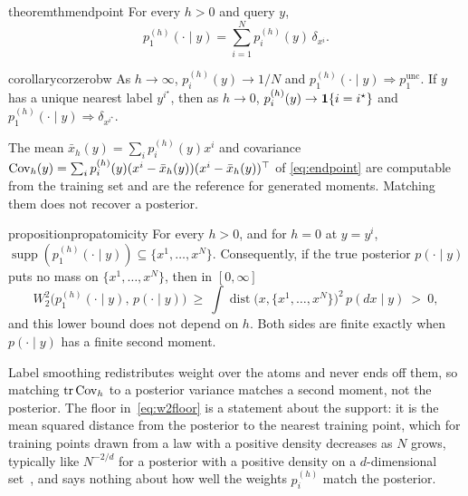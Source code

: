 \documentclass{article} %
\newif\ificlr
\theoremstyle{plain}
\theoremstyle{definition}
\theoremstyle{remark}
\begin{document}
\begin{restatable}{theorem}{thmendpoint}
\label{thm:endpoint}
For every $h>0$ and query $y$,
\begin{equation}
p_1^{(h)}(\cdot\mid y)=\sum_{i=1}^N p_i^{(h)}(y)\,\delta_{x^i}.
\label{eq:endpoint}
\end{equation} 
\end{restatable}

\begin{restatable}{corollary}{corzerobw}
\label{cor:zerobw}
As $h\to\infty$, $p_i^{(h)}(y)\to1/N$ and $p_1^{(h)}(\cdot\mid y)\Rightarrow p_1^{\mathrm{unc}}$. If
$y$ has a unique nearest label $y^{i^\star}$, then as $h\to0$, $p_i^{(h)}(y)\to\mathbf{1}\{i=i^\star\}$
and $p_1^{(h)}(\cdot\mid y)\Rightarrow\delta_{x^{i^\star}}$. 
\end{restatable}
The mean $\bar x_h(y)=\sum_ip_i^{(h)}(y)x^i$ and covariance
$\operatorname{Cov}_h(y)=\sum_ip_i^{(h)}(y)(x^i-\bar x_h(y))(x^i-\bar x_h(y))^\top$ of \eqref{eq:endpoint} are
computable from the training set and are the reference for generated moments. Matching them
does not recover a posterior.

\begin{restatable}{proposition}{propatomicity}
\label{prop:atomicity}
For every $h>0$, and for $h=0$ at $y=y^i$, $\operatorname{supp}(p_1^{(h)}(\cdot\mid y))
\subseteq\{x^1,\dots,x^N\}$. Consequently, if the true posterior $p(\cdot\mid y)$ puts no
mass on $\{x^1,\dots,x^N\}$, then in $[0,\infty]$
\begin{equation}
W_2^2\big(p_1^{(h)}(\cdot\mid y),\,p(\cdot\mid y)\big)\ \ge\
\int\operatorname{dist}\big(x,\{x^1,\dots,x^N\}\big)^2\,p(dx\mid y)\ >\ 0,
\label{eq:w2floor}
\end{equation}
and this lower bound does not depend on $h$. Both sides are finite exactly when
$p(\cdot\mid y)$ has a finite second moment. \proofin{apx:pf-atomicity}
\end{restatable}
Label smoothing redistributes weight over the atoms and never ends off them, so
matching $\operatorname{tr}\operatorname{Cov}_h$ to a posterior variance matches a second moment, not the posterior.\ificlr\else{}
The floor in~\eqref{eq:w2floor} is a statement about the support: it is the mean squared distance
from the posterior to the nearest training point, which for training points drawn from a law with a
positive density decreases as $N$ grows, typically like $N^{-2/d}$ for a posterior with a positive
density on a $d$-dimensional set~\citep{graf2000quantization}, and says nothing about how well
the weights $p_i^{(h)}$ match the posterior.\fi
\end{document}
